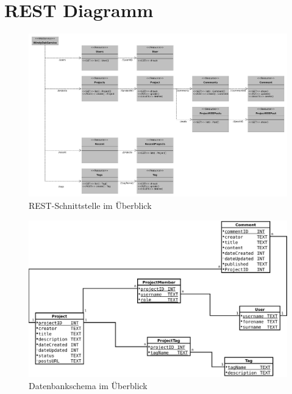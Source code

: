 \documentclass[12pt]{scrartcl}
\begin{document}
		\section{REST Diagramm} \label{sec:restdiagramm}
			\begin{landscape}
			 \begin{figure}
			  \centering
			  \includegraphics[width=\linewidth,height=\textheight,keepaspectratio]{Bilder/rest.pdf} 
			  \caption{REST-Schnittstelle im Überblick}
			  \label{fig:rest}
			 \end{figure}
			\end{landscape}
		\begin{landscape}
			\begin{figure}
  				\centering
  				\includegraphics[width=\linewidth,height=\textheight,keepaspectratio]{Bilder/db.pdf} 
  				\caption{Datenbankschema im Überblick}
  				\label{fig:db}
		 	\end{figure}
		\end{landscape}
		
\end{document}
